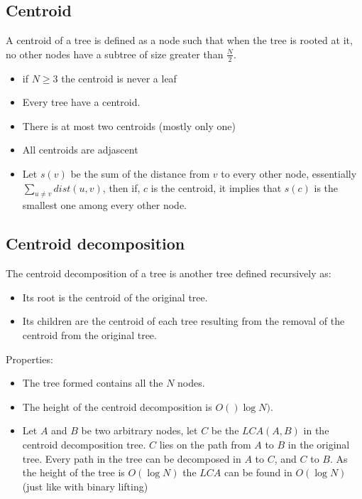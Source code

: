\subsection{Centroid}

A  centroid of a tree is defined as a node such that when the tree is rooted at it, no other nodes have a subtree of size greater than $\frac{N}{2}$.

\begin{itemize}
  \item if $N \geq 3$ the centroid is never a leaf
  \item Every tree have a centroid.
  \item There is at most two centroids (mostly only one)
  \item All centroids are adjascent
  \item Let $s(v)$ be the sum of the distance from $v$ to every other node, essentially $\sum_{u \neq v} dist(u,v)$, then if, $c$ is the centroid, it implies that $s(c)$ is the smallest one among every other node.
\end{itemize}

\subsection{Centroid decomposition}

The centroid decomposition of a tree is another tree defined recursively as:

\begin{itemize}
  \item Its root is the centroid of the original tree.
  \item Its children are the centroid of each tree resulting from the removal of the centroid from the original tree.
\end{itemize}

Properties:

\begin{itemize}
  \item The tree formed contains all the $N$ nodes.
  \item The height of the centroid decomposition is $O()\log{N})$.
  \item Let $A$ and $B$ be two arbitrary nodes, let $C$ be the $LCA(A,B)$ in the centroid decomposition tree.
    \subitem $C$ lies on the path from $A$ to $B$ in the original tree.
    \subitem Every path in the tree can be decomposed in $A$ to $C$, and $C$ to $B$.
    \subitem As the height of the tree is $O(\log{N})$ the $LCA$ can be found in $O(\log{N})$ (just like with binary lifting)
\end{itemize}

